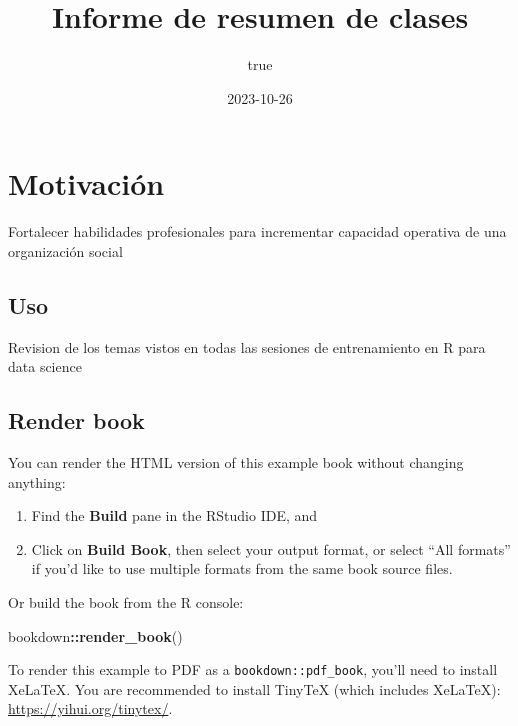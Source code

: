 \documentclass[
]{book}
\title{Informe de resumen de clases}
\author{true}
\date{2023-10-26}
\newenvironment{Shaded}{\begin{snugshade}}{\end{snugshade}}
\newcommand{\FunctionTok}[1]{\textcolor[rgb]{0.13,0.29,0.53}{\textbf{#1}}}
\newcommand{\NormalTok}[1]{#1}
\newcommand{\SpecialCharTok}[1]{\textcolor[rgb]{0.81,0.36,0.00}{\textbf{#1}}}
\theoremstyle{definition}
\theoremstyle{definition}
\theoremstyle{definition}
\theoremstyle{definition}
\theoremstyle{remark}
\begin{document}
\maketitle

{
\setcounter{tocdepth}{1}
\tableofcontents
}
\hypertarget{motivaciuxf3n}{%
\chapter*{Motivación}\label{motivaciuxf3n}}

Fortalecer habilidades profesionales para incrementar capacidad operativa de una organización social

\hypertarget{uso}{%
\section*{Uso}\label{uso}}

Revision de los temas vistos en todas las sesiones de entrenamiento en R para data science

\hypertarget{render-book}{%
\section*{Render book}\label{render-book}}

You can render the HTML version of this example book without changing anything:

\begin{enumerate}
\def\labelenumi{\arabic{enumi}.}
\item
  Find the \textbf{Build} pane in the RStudio IDE, and
\item
  Click on \textbf{Build Book}, then select your output format, or select ``All formats'' if you'd like to use multiple formats from the same book source files.
\end{enumerate}

Or build the book from the R console:

\begin{Shaded}
\begin{Highlighting}[]
\NormalTok{bookdown}\SpecialCharTok{::}\FunctionTok{render\_book}\NormalTok{()}
\end{Highlighting}
\end{Shaded}

To render this example to PDF as a \texttt{bookdown::pdf\_book}, you'll need to install XeLaTeX. You are recommended to install TinyTeX (which includes XeLaTeX): \url{https://yihui.org/tinytex/}.
\end{document}
